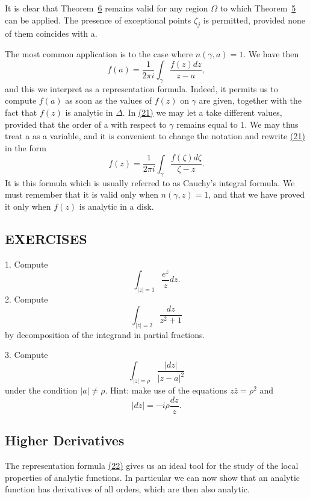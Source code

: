 It is clear that Theorem~\hyperref[thm:4.6]{6} remains valid for any region $\Omega$ to which Theorem~\hyperref[thm:4.5]{5} can be applied. The presence of exceptional points $\zeta_j$ is permitted, provided none of them coincides with a.

The most common application is to the case where $n(\gamma,a)=1$. We have then
\begin{equation*}
f (a) = \frac {1}{2 \pi i} \int_ {\gamma} \frac {f (z) d z}{z - a},\tag{21}\label{eq:4.21}
\end{equation*}
and this we interpret as a representation formula. Indeed, it permits us to compute $f(a)$ as soon as the values of $f(z)$ on $\gamma$ are given, together with the fact that $f(z)$ is analytic in $\Delta$. In \hyperref[eq:4.21]{(21)} we may let a take different values, provided that the order of a with respect to $\gamma$ remains equal to 1. We may thus treat a as a variable, and it is convenient to change the notation and rewrite \hyperref[eq:4.21]{(21)} in the form
\begin{equation*}
f (z) = \frac {1}{2 \pi i} \int_ {\gamma} \frac {f (\zeta) d \zeta}{\zeta - z}.\tag{22}\label{eq:4.22}
\end{equation*}
It is this formula which is usually referred to as Cauchy's integral formula. We must remember that it is valid only when $n(\gamma,z)=1$, and that we have proved it only when $f(z)$ is analytic in a disk.

\subsection*{EXERCISES}
1. Compute
\begin{equation*}
\int_ {| z | = 1} \frac {e ^ {z}}{z} d z.
\end{equation*}
2. Compute
\begin{equation*}
\int_ {| z | = 2} \frac {d z}{z ^ {2} + 1}
\end{equation*}
by decomposition of the integrand in partial fractions.

3. Compute
\begin{equation*}
\int_ {| z | = \rho} \frac {| d z |}{| z - a | ^ {2}}
\end{equation*}
under the condition $|a| \neq \rho$. Hint: make use of the equations $z\bar{z} = \rho^2$ and
\begin{equation*}
| d z | = - i \rho \frac {d z}{z}.
\end{equation*}
\setcounter{section}{2}\setcounter{subsection}{2}\subsection{Higher Derivatives}\label{sec:4.2.3}
The representation formula \hyperref[eq:4.22]{(22)} gives us an ideal tool for the study of the local properties of analytic functions. In particular we can now show that an analytic function has derivatives of all orders, which are then also analytic.

